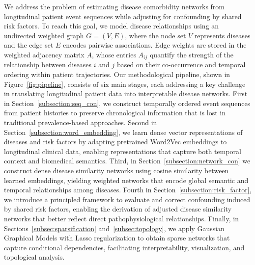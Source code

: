 We address the problem of estimating disease comorbidity networks from longitudinal patient event sequences while adjusting for confounding by shared risk factors. To reach this goal, we model disease relationships using an undirected weighted graph $G=(V,E)$, where the node set $V$ represents diseases and the edge set $E$ encodes pairwise associations. Edge weights are stored in the weighted adjacency matrix $A$, whose entries $A_{ij}$ quantify the strength of the relationship between diseases $i$ and $j$ based on their co-occurrence and temporal ordering within patient trajectories. Our methodological pipeline, shown in Figure~\ref{fig:pipeline}, consists of six main stages, each addressing a key challenge in translating longitudinal patient data into interpretable disease networks. First in Section~\ref{subsection:seq_con}, we construct temporally ordered event sequences from patient histories to preserve chronological information that is lost in traditional prevalence-based approaches. Second in Section~\ref{subsection:word_embedding}, we learn dense vector representations of diseases and risk factors by adapting pretrained Word2Vec embeddings to longitudinal clinical data, enabling representations that capture both temporal context and biomedical semantics. Third, in Section~\ref{subsection:network_con} we construct dense disease similarity networks using cosine similarity between learned embeddings, yielding weighted networks that encode global semantic and temporal relationships among diseases. Fourth in Section~\ref{subsection:risk_factor}, we introduce a principled framework to evaluate and correct confounding induced by shared risk factors, enabling the derivation of adjusted disease similarity networks that better reflect direct pathophysiological relationships. Finally, in Sections~\ref{subsec:sparsification} and~\ref{subsec:topology}, we apply Gaussian Graphical Models with Lasso regularization to obtain sparse networks that capture conditional dependencies, facilitating interpretability, visualization, and topological analysis.


